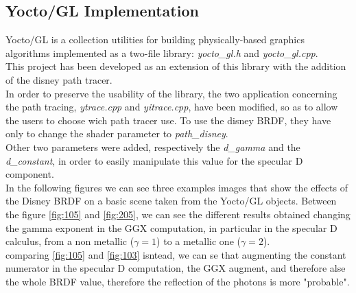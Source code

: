 \documentclass[11pt]{article}
\begin{document}
\subsection{Yocto/GL Implementation}
Yocto/GL is a collection utilities for building physically-based graphics algorithms implemented as a two-file library: \textit{yocto\_gl.h} and \textit{yocto\_gl.cpp}.\\
This project has been developed as an extension of this library with the addition of the disney path tracer.\\
In order to preserve the usability of the library, the two application concerning the path tracing, \textit{ytrace.cpp} and \textit{yitrace.cpp}, have been modified, so as to allow the users to choose wich path tracer use. To use the disney BRDF, they have only to change the shader parameter to \textit{path\_disney}.\\
Other two parameters were added, respectively the \textit{d\_gamma} and the \textit{d\_constant}, in order to easily manipulate this value for the specular D component.\\

In the following figures we can see three examples images that show the effects of the Disney BRDF on a basic scene taken from the Yocto/GL objects. 
Between the figure \ref{fig:105} and \ref{fig:205}, we can see the different results obtained changing the gamma exponent in the GGX computation, in particular in the specular D calculus, from a non metallic ($\gamma = 1$) to a metallic one ($\gamma = 2$).\\
comparing \ref{fig:105} and \ref{fig:103} isntead, we can se that augmenting the constant numerator in the specular D computation, the GGX augment, and therefore alse the whole BRDF value, therefore the reflection of the photons is more "probable".
\end{document}
